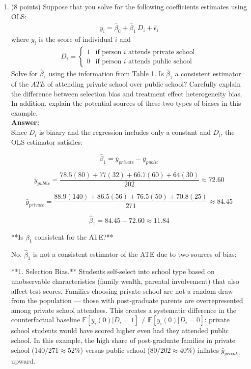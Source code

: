 \documentclass[letterpaper,12pt]{article}
\begin{document}
\begin{enumerate}[label=(\alph*)]
\item (8 points) Suppose that you solve for the following coefficients estimates using OLS:
\begin{eqnarray*}
y_i=\hat{\beta}_0+\hat{\beta}_1 \: D_i+\hat{\epsilon}_i
\end{eqnarray*}
where $y_i$ is the score of individual $i$ and 
\begin{eqnarray*}
D_i=\begin{cases}
		1 & \text{if person $i$ attends private school} \\
             0 & \text{if person $i$ attends public school} 
\end{cases}
\end{eqnarray*}	
Solve for $\hat{\beta}_1$ using the information from Table 1. Is $\hat{\beta}_1$ a consistent estimator of the $ATE$ of attending private school over public school? Carefully explain the difference between selection bias and treatment effect heterogeneity bias. In addition, explain the potential sources of these two types of biases in this example. \\
\textbf{Answer:}\\
Since $D_i$ is binary and the regression includes only a constant and $D_i$, the OLS estimator satisfies:

$$\hat{\beta}_1 = \bar{y}_{private} - \bar{y}_{public}$$

$$\bar{y}_{public} = \frac{78.5(80) + 77(32) + 66.7(60) + 64(30)}{202} \approx 72.60$$

$$\bar{y}_{private} = \frac{88.9(140) + 86.5(56) + 76.5(50) + 70.8(25)}{271}  \approx 84.45$$

$$\hat{\beta}_1 = 84.45 - 72.60 \approx 11.84$$

**Is $\hat{\beta}_1$ consistent for the ATE?**

No. $\hat{\beta}_1$ is not a consistent estimator of the ATE due to two sources of bias:

**1. Selection Bias.** Students self-select into school type based on unobservable characteristics (family wealth, parental involvement) that also affect test scores. Families choosing private school are not a random draw from the population — those with post-graduate parents are overrepresented among private school attendees. This creates a systematic difference in the counterfactual baseline $\mathbb{E}[y_i(0)|D_i=1] \neq \mathbb{E}[y_i(0)|D_i=0]$: private school students would have scored higher even had they attended public school. In this example, the high share of post-graduate families in private school ($140/271 \approx 52\%$) versus public school ($80/202 \approx 40\%$) inflates $\bar{y}_{private}$ upward.


\end{enumerate}
\end{document}
